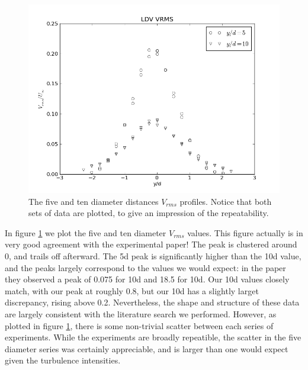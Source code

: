 \documentclass{article}
\begin{document}
\begin{figure}[!htb]
 \begin{center}
  \includegraphics[width = 12 cm]{figs/vrms}
  \caption{The five and ten diameter distances $V_{rms}$ profiles. Notice that both sets of data are plotted, to give an impression of the repeatability. }
  \label{vrms}
 \end{center}
\end{figure}

In figure \ref{vrms} we plot the five and ten diameter $V_{rms}$ values. 
This figure actually is in very good agreement with the experimental paper! 
The peak is clustered around 0, and trails off afterward. The 5d 
peak is significantly higher than the 10d value, and the peaks largely 
correspond to the values we would expect: in the paper they observed a 
peak of 0.075 for 10d and 18.5 for 10d. Our 10d values closely match, with our
peak at roughly 0.8, but our 10d has a slightly larget discrepancy, rising above 0.2. 
Nevertheless, the shape and structure of these data are largely consistent with the 
literature search we performed. However, as plotted in figure \ref{vrms}, 
there is some non-trivial scatter between each series of experiments. While the experiments
are broadly repeatible, the scatter in the five diameter series was certainly appreciable, and is
larger than one would expect given the turbulence intensities. 

%
%
\end{document}
